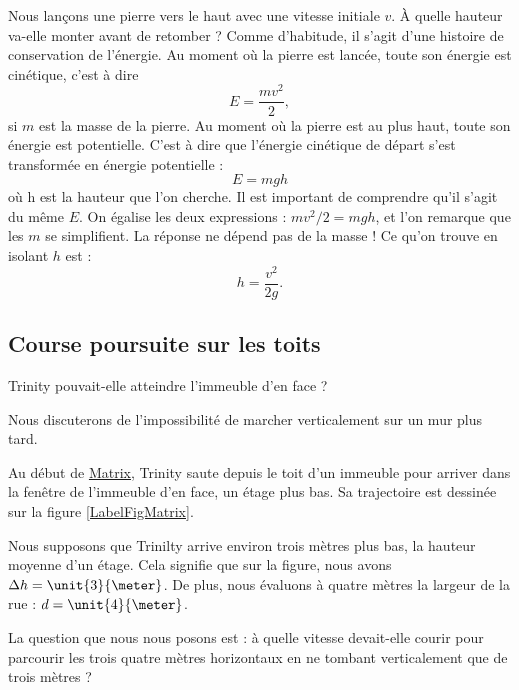 Nous lançons une pierre vers le haut avec une vitesse initiale $v$. À quelle hauteur va-elle monter avant de retomber ? Comme d'habitude, il s'agit d'une histoire de conservation de l'énergie. Au moment où la pierre est lancée, toute son énergie est cinétique, c'est à dire
\[ 
  E=\frac{ mv^2 }{ 2 },
\]
si $m$ est la masse de la pierre. Au moment où la pierre est au plus haut, toute son énergie est potentielle. C'est à dire que l'énergie cinétique de départ s'est transformée en énergie potentielle :
\[ 
  E=mgh
\]
 où h est la hauteur que l'on cherche. Il est important de comprendre qu'il s'agit du même $E$. On égalise les deux expressions : $mv^2/2=mgh$, et l'on remarque que les $m$ se simplifient. La réponse ne dépend pas de la masse ! Ce qu'on trouve en isolant $h$ est :
\begin{equation}
h=\frac{ v^2 }{ 2g }.
\end{equation}  

\subsection{Course poursuite sur les toits}

\begin{pourquoidonc}
	Trinity pouvait-elle atteindre l'immeuble d'en face ? 
	
	Nous discuterons de l'impossibilité de marcher verticalement sur un mur plus tard.
\end{pourquoidonc}

Au début de \href{http://fr.wikipedia.org/wiki/Matrix}{Matrix}, Trinity saute depuis le toit d'un immeuble pour arriver dans la fenêtre de l'immeuble d'en face, un étage plus bas. Sa trajectoire est dessinée sur la figure \ref{LabelFigMatrix}.
\newcommand{\CaptionFigMatrix}{La trajectoire suivie par Trinity.}

Nous supposons que Trinilty arrive environ trois mètres plus bas, la hauteur moyenne d'un étage. Cela signifie que sur la figure, nous avons $\Delta h=\unit{3}{\meter}$. De plus, nous évaluons à quatre mètres la largeur de la rue : $d=\unit{4}{\meter}$.

La question que nous nous posons est : à quelle vitesse devait-elle courir pour parcourir les trois quatre mètres horizontaux en ne tombant verticalement que de trois mètres ?

